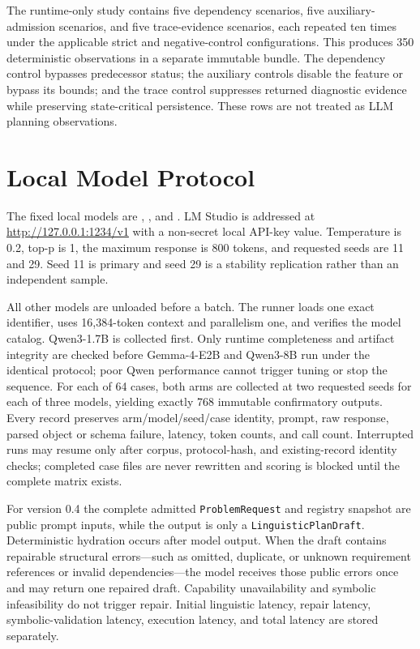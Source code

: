 The runtime-only study contains five dependency scenarios, five auxiliary-admission scenarios, and five trace-evidence scenarios, each repeated ten times under the applicable strict and negative-control configurations. This produces 350 deterministic observations in a separate immutable bundle. The dependency control bypasses predecessor status; the auxiliary controls disable the feature or bypass its bounds; and the trace control suppresses returned diagnostic evidence while preserving state-critical persistence. These rows are not treated as LLM planning observations.

\section{Local Model Protocol}

The fixed local models are , , and . LM Studio is addressed at \url{http://127.0.0.1:1234/v1} with a non-secret local API-key value. Temperature is 0.2, top-p is 1, the maximum response is 800 tokens, and requested seeds are 11 and 29. Seed 11 is primary and seed 29 is a stability replication rather than an independent sample.

All other models are unloaded before a batch. The runner loads one exact identifier, uses 16,384-token context and parallelism one, and verifies the model catalog. Qwen3-1.7B is collected first. Only runtime completeness and artifact integrity are checked before Gemma-4-E2B and Qwen3-8B run under the identical protocol; poor Qwen performance cannot trigger tuning or stop the sequence. For each of 64 cases, both arms are collected at two requested seeds for each of three models, yielding exactly 768 immutable confirmatory outputs. Every record preserves arm/model/seed/case identity, prompt, raw response, parsed object or schema failure, latency, token counts, and call count. Interrupted runs may resume only after corpus, protocol-hash, and existing-record identity checks; completed case files are never rewritten and scoring is blocked until the complete matrix exists.

For version 0.4 the complete admitted \texttt{ProblemRequest} and registry snapshot are public prompt inputs, while the output is only a \texttt{LinguisticPlanDraft}. Deterministic hydration occurs after model output. When the draft contains repairable structural errors---such as omitted, duplicate, or unknown requirement references or invalid dependencies---the model receives those public errors once and may return one repaired draft. Capability unavailability and symbolic infeasibility do not trigger repair. Initial linguistic latency, repair latency, symbolic-validation latency, execution latency, and total latency are stored separately.

